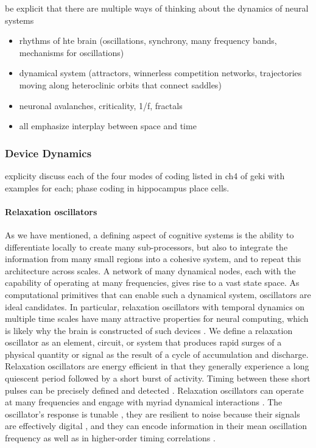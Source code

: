 \documentclass[twocolumn]{article}
\begin{document}
\vspace{3em}
be explicit that there are multiple ways of thinking about the dynamics of neural systems
\begin{itemize}
\item rhythms of hte brain (oscillations, synchrony, many frequency bands, mechanisms for oscillations)
\item dynamical system (attractors, winnerless competition networks, trajectories moving along heteroclinic orbits that connect saddles)
\item neuronal avalanches, criticality, 1/f, fractals
\item all emphasize interplay between space and time
\end{itemize}

\subsubsection{Device Dynamics}

\vspace{3em}
explicity discuss each of the four modes of coding listed in ch4 of geki with examples for each; phase coding in hippocampus place cells.

\paragraph{Relaxation oscillators}
As we have mentioned, a defining aspect of cognitive systems is the ability to differentiate locally to create many sub-processors, but also to integrate the information from many small regions into a cohesive system, and to repeat this architecture across scales. A network of many dynamical nodes, each with the capability of operating at many frequencies, gives rise to a vast state space. As computational primitives that can enable such a dynamical system, oscillators are ideal candidates. In particular, relaxation oscillators \cite{st2015,mist1990,soko1993,lued1997,huya2000,bu2006,gile2011,vepe1968,cacl1981} with temporal dynamics on multiple time scales \cite{soko1993} have many attractive properties for neural computing, which is likely why the brain is constructed of such devices \cite{ll1988}. We define a relaxation oscillator as an element, circuit, or system that produces rapid surges of a physical quantity or signal as the result of a cycle of accumulation and discharge. Relaxation oscillators are energy efficient in that they generally experience a long quiescent period followed by a short burst of activity. Timing between these short pulses can be precisely defined and detected \cite{bu2006}. Relaxation oscillators can operate at many frequencies \cite{huya2000} and engage with myriad dynamical interactions \cite{lued1997}. The oscillator's response is tunable \cite{huya2000}, they are resilient to noise because their signals are effectively digital \cite{stgo2005}, and they can encode information in their mean oscillation frequency as well as in higher-order timing correlations \cite{pasc1999,thde2001,sase2001,stse2007,brcl2010,haah2015}.
\end{document}

